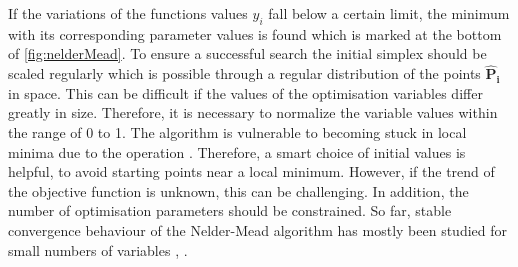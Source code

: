 If the variations of the functions values $y_i$ fall below a certain limit, the minimum with its corresponding parameter values is found which is marked at the bottom of \autoref{fig:nelderMead}. To ensure a successful search the initial simplex should be scaled regularly \cite{baudin_nelder-mead_nodate} which is possible through a regular distribution of the points $\mathbf{\hat{P}_i}$ in space. This can be difficult if the values of the optimisation variables differ greatly in size. Therefore, it is necessary to normalize the variable values within the range of 0 to 1. The algorithm is vulnerable to becoming stuck in local minima due to the  operation \cite{luersen_globalized_2004}. Therefore, a smart choice of initial values is helpful, to avoid starting points near a local minimum. However, if the trend of the objective function is unknown, this can be challenging. In addition, the number of optimisation parameters should be constrained. So far, stable convergence behaviour of the Nelder-Mead algorithm has mostly been studied for small numbers of variables \cite{singer_efficient_2004}, \cite{pham_comparative_2011}.








 



